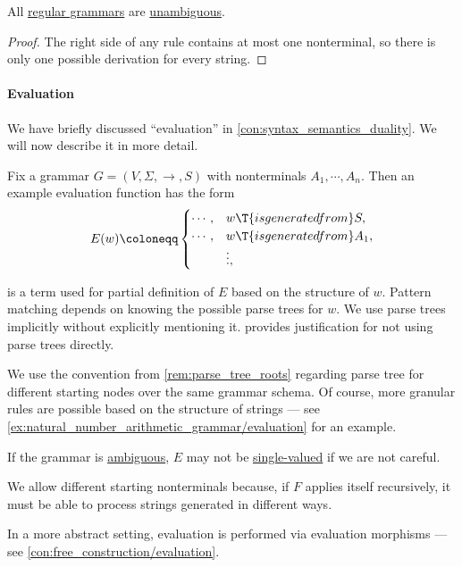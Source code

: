 \begin{proposition}\label{thm:regular_grammars_are_unambiguous}
  All \hyperref[def:chomsky_hierarchy/regular]{regular grammars} are \hyperref[def:grammar_ambiguity]{unambiguous}.
\end{proposition}
\begin{proof}
  The right side of any rule contains at most one nonterminal, so there is only one possible derivation for every string.
\end{proof}

\paragraph{Evaluation}

\begin{concept}\label{con:evaluation}
  We have briefly discussed \enquote{evaluation} in \cref{con:syntax_semantics_duality}. We will now describe it in more detail.

  Fix a grammar \( G = (V, \Sigma, \to, S) \) with nonterminals \( A_1, \cdots, A_n \). Then an example evaluation function has the form
  \begin{equation*}
    E(w) \coloneqq \begin{cases}
      \cdots, &w \T{is generated from} S, \\
      \cdots, &w \T{is generated from} A_1, \\
              &\vdots,
    \end{cases}
  \end{equation*}

   is a term used for partial definition of \( E \) based on the structure of \( w \). Pattern matching depends on knowing the possible parse trees for \( w \). We use parse trees implicitly without explicitly mentioning it.  provides justification for not using parse trees directly.

  We use the convention from \cref{rem:parse_tree_roots} regarding parse tree for different starting nodes over the same grammar schema. Of course, more granular rules are possible based on the structure of strings --- see \cref{ex:natural_number_arithmetic_grammar/evaluation} for an example.
\end{concept}
\begin{comments}
  \item If the grammar is \hyperref[def:grammar_ambiguity]{ambiguous}, \( E \) may not be \hyperref[def:function]{single-valued} if we are not careful.

  \item We allow different starting nonterminals because, if \( F \) applies itself recursively, it must be able to process strings generated in different ways.

  \item In a more abstract setting, evaluation is performed via evaluation morphisms --- see \cref{con:free_construction/evaluation}.
\end{comments}

